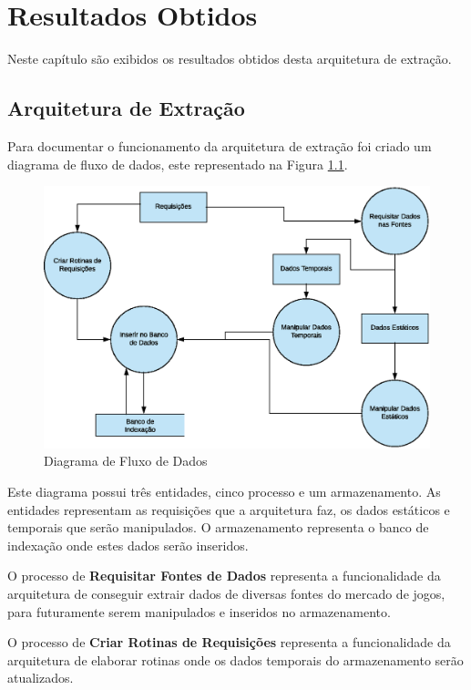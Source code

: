 \chapter[Resultados Obtidos]{Resultados Obtidos}
Neste capítulo são exibidos os resultados obtidos desta arquitetura de extração.

\section{Arquitetura de Extração}
Para documentar o funcionamento da arquitetura de extração foi criado um diagrama de fluxo de dados, este representado na Figura \ref{image:diagramFlux}.
\begin{figure} [H]
\centering
\includegraphics[scale=0.45]{figuras/diagramaFluxo.eps}
\caption{Diagrama de Fluxo de Dados}
\label{image:diagramFlux}
\end{figure}

Este diagrama possui três entidades, cinco processo e um armazenamento. As entidades representam as requisições que a arquitetura faz, os dados estáticos e temporais que serão manipulados. O armazenamento representa o banco de indexação onde estes dados serão inseridos.

O processo de \textbf{Requisitar Fontes de Dados} representa a funcionalidade da arquitetura de conseguir extrair dados de diversas fontes do mercado de jogos, para futuramente serem manipulados e inseridos no armazenamento.

O processo de \textbf{Criar Rotinas de Requisições} representa a funcionalidade da arquitetura de elaborar rotinas onde os dados temporais do armazenamento serão atualizados.

